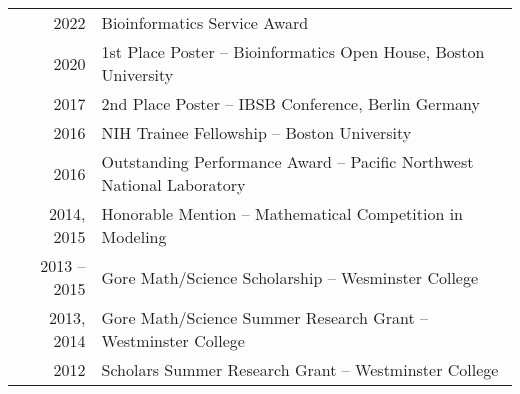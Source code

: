 \documentclass[a4paper,10pt]{report}
\begin{document}
\section{\color{linkcolour}{Honors and Awards}}
\begin{tabular}{rl}
	2022         & Bioinformatics Service Award                                           \\
	2020         & 1st Place Poster -- Bioinformatics Open House, Boston University       \\
	2017         & 2nd Place Poster -- IBSB Conference, Berlin Germany                    \\
	2016         & NIH Trainee Fellowship -- Boston University                            \\
	2016         & Outstanding Performance Award -- Pacific Northwest National Laboratory \\
	2014, 2015   & Honorable Mention -- Mathematical Competition in Modeling              \\
	2013 -- 2015 & Gore Math/Science Scholarship -- Wesminster College                    \\
	2013, 2014   & Gore Math/Science Summer Research Grant -- Westminster College         \\
	2012         & Scholars Summer Research Grant -- Westminster College
\end{tabular}
\end{document}
